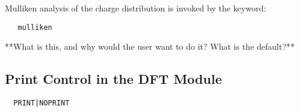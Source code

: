 Mulliken analysis of the charge distribution is invoked by the keyword:
\begin{verbatim}
   mulliken
\end{verbatim}

\Large
**What is this, and why would the user want to do it?  What is the default?**
\normalsize



\subsection{Print Control in the DFT Module}
\begin{verbatim}
  PRINT|NOPRINT
\end{verbatim}

